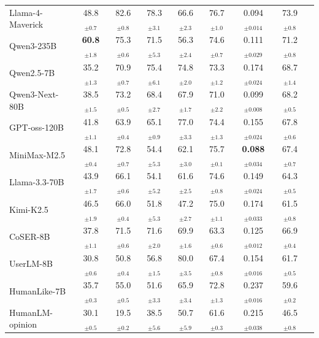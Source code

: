 \begin{table}[t]
{\begin{tabular}{@{}l cccc c cc c@{}}
\rowcolor{green!5} Llama-4-Maverick & 48.8$_{\pm0.7}$ & 82.6$_{\pm0.8}$ & 78.3$_{\pm3.1}$ & 66.6$_{\pm2.3}$ & 76.7$_{\pm1.0}$ & 0.094$_{\pm0.014}$ & 73.9$_{\pm0.8}$ \\
\rowcolor{green!5} Qwen3-235B & \textbf{60.8$_{\pm1.8}$} & 75.3$_{\pm0.6}$ & 71.5$_{\pm5.3}$ & 56.3$_{\pm2.4}$ & 74.6$_{\pm0.7}$ & 0.111$_{\pm0.029}$ & 71.2$_{\pm0.8}$ \\
\rowcolor{green!5} Qwen2.5-7B & 35.2$_{\pm1.3}$ & 70.9$_{\pm0.7}$ & 75.4$_{\pm6.1}$ & 74.8$_{\pm2.0}$ & 73.3$_{\pm1.2}$ & 0.174$_{\pm0.024}$ & 68.7$_{\pm1.4}$ \\
\rowcolor{green!5} Qwen3-Next-80B & 38.5$_{\pm1.5}$ & 73.2$_{\pm0.5}$ & 68.4$_{\pm2.7}$ & 67.9$_{\pm1.7}$ & 71.0$_{\pm2.2}$ & 0.099$_{\pm0.008}$ & 68.2$_{\pm0.5}$ \\
\rowcolor{green!5} GPT-oss-120B & 41.8$_{\pm1.1}$ & 63.9$_{\pm0.4}$ & 65.1$_{\pm0.9}$ & 77.0$_{\pm3.3}$ & 74.4$_{\pm1.3}$ & 0.155$_{\pm0.024}$ & 67.8$_{\pm0.6}$ \\
\rowcolor{green!5} MiniMax-M2.5 & 48.1$_{\pm0.4}$ & 72.8$_{\pm0.7}$ & 54.4$_{\pm5.3}$ & 62.1$_{\pm3.0}$ & 75.7$_{\pm0.1}$ & \textbf{0.088$_{\pm0.034}$} & 67.4$_{\pm0.7}$ \\
\rowcolor{green!5} Llama-3.3-70B & 43.9$_{\pm1.7}$ & 66.1$_{\pm0.6}$ & 54.1$_{\pm5.2}$ & 61.6$_{\pm2.5}$ & 74.6$_{\pm0.8}$ & 0.149$_{\pm0.024}$ & 64.3$_{\pm0.5}$ \\
\rowcolor{green!5} Kimi-K2.5 & 46.5$_{\pm1.9}$ & 66.0$_{\pm0.4}$ & 51.8$_{\pm5.3}$ & 47.2$_{\pm2.7}$ & 75.0$_{\pm1.1}$ & 0.174$_{\pm0.033}$ & 61.5$_{\pm0.8}$ \\
\midrule
\rowcolor{orange!5} CoSER-8B & 37.8$_{\pm1.1}$ & 71.5$_{\pm0.6}$ & 71.6$_{\pm2.0}$ & 69.9$_{\pm1.6}$ & 63.3$_{\pm0.6}$ & 0.125$_{\pm0.012}$ & 66.9$_{\pm0.4}$ \\
\rowcolor{orange!5} UserLM-8B & 30.8$_{\pm0.6}$ & 50.8$_{\pm0.4}$ & 56.8$_{\pm1.5}$ & 80.0$_{\pm3.5}$ & 67.4$_{\pm0.8}$ & 0.154$_{\pm0.016}$ & 61.7$_{\pm0.5}$ \\
\rowcolor{orange!5} HumanLike-7B & 35.7$_{\pm0.3}$ & 55.0$_{\pm0.5}$ & 51.6$_{\pm3.3}$ & 65.9$_{\pm3.4}$ & 72.8$_{\pm1.3}$ & 0.237$_{\pm0.016}$ & 59.6$_{\pm0.2}$ \\
\rowcolor{orange!5} HumanLM-opinion & 30.1$_{\pm0.5}$ & 19.5$_{\pm0.2}$ & 38.5$_{\pm5.6}$ & 50.7$_{\pm5.9}$ & 61.6$_{\pm0.3}$ & 0.215$_{\pm0.038}$ & 46.5$_{\pm0.8}$ \\
\bottomrule
\end{tabular}}
\end{table}

